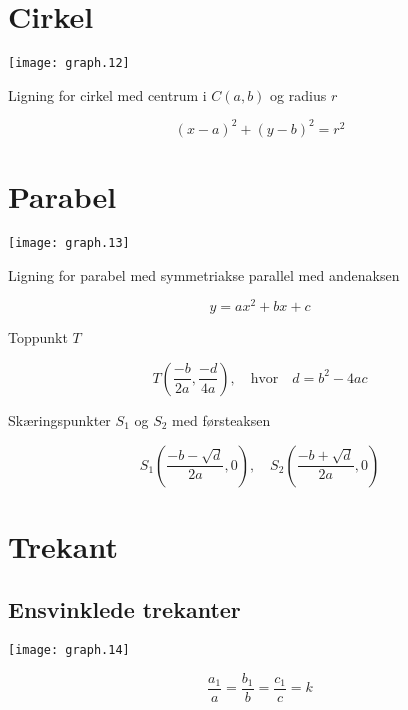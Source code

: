 \documentclass[11pt,a4paper,landscape,twocolumn,fleqn,leqno]{article}
\begin{document}
\vfill

\section{Cirkel}

\texttt{[image: graph.12]}

Ligning for cirkel med centrum i $C(a,b)$ og radius $r$

\begin{equation}
(x-a)^2 + (y-b)^2 = r^2
\end{equation}

\newpage

\section{Parabel}

\texttt{[image: graph.13]}

Ligning for parabel med symmetriakse parallel med andenaksen

\begin{equation}
y = ax^2 + bx +c
\end{equation}

Toppunkt $T$

\begin{equation}
T\left(\frac{-b}{2a}, \frac{-d}{4a}\right), \quad \text{hvor} \quad d = b^2 - 4ac
\end{equation}

Skæringspunkter $S_1$ og $S_2$ med førsteaksen

\begin{equation}
S_1\left(\frac{-b - \sqrt{d}}{2a}, 0\right), \quad S_2\left(\frac{-b + \sqrt{d}}{2a}, 0\right)
\end{equation}

\newpage

\section{Trekant}

\subsection{Ensvinklede trekanter}

\texttt{[image: graph.14]}

\begin{equation}
\frac{a_1}{a} = \frac{b_1}{b} = \frac{c_1}{c} = k
\end{equation}
\end{document}

